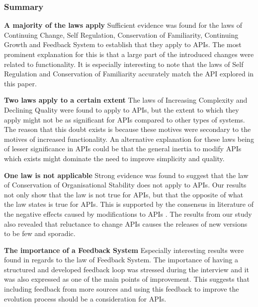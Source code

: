 \documentclass{sig-alternate}
\begin{document}
\subsubsection{Summary}

\noindent
\textbf{A majority of the laws apply  } %
Sufficient evidence was found for the laws of Continuing Change, Self Regulation, Conservation of Familiarity, Continuing Growth and Feedback System to establish that they apply to APIs. The most prominent explanation for this is that a large part of the introduced changes were related to functionality. It is especially interesting to note that the laws of Self Regulation and Conservation of Familiarity accurately match the API explored in this paper. 

\smallskip \noindent
\textbf{Two laws apply to a certain extent  } %
The laws of Increasing Complexity and Declining Quality were found to apply to APIs, but the extent to which they apply might not be as significant for APIs compared to other types of systems. The reason that this doubt exists is because these motives were secondary to the motives of increased functionality. An alternative explanation for these laws being of lesser significance in APIs could be that the general inertia to modify APIs which exists \cite{google_talk} \cite{henning2007api} \cite{mcdonnell2013empirical} \cite{robbes2012developers} might dominate the need to improve simplicity and quality. 

\smallskip \noindent
\textbf{One law is not applicable  } %
Strong evidence was found to suggest that the law of Conservation of Organisational Stability does not apply to APIs. Our results not only show that the law is not true for APIs, but that the opposite of what the law states is true for APIs. This is supported by the consensus in literature of the negative effects caused by modifications to APIs \cite{google_talk} \cite{henning2007api} \cite{mcdonnell2013empirical} \cite{robbes2012developers}. The results from our study also revealed that reluctance to change APIs causes the releases of new versions to be few and sporadic. 

\smallskip \noindent
\textbf{The importance of a Feedback System  } %
Especially interesting results were found in regards to the law of Feedback System. The importance of having a structured and developed feedback loop was stressed during the interview and it was also expressed as one of the main points of improvement. This suggests that including feedback from more sources and using this feedback to improve the evolution process should be a consideration for APIs. 
\end{document}
